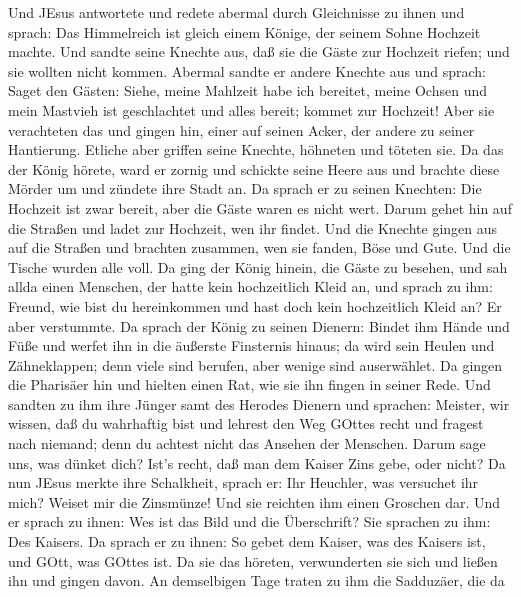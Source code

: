  Und JEsus antwortete und redete abermal durch Gleichnisse
zu ihnen und sprach:  Das Himmelreich ist gleich einem
Könige, der seinem Sohne Hochzeit machte.  Und sandte seine
Knechte aus, daß sie die Gäste zur Hochzeit riefen; und sie wollten
nicht kommen.  Abermal sandte er andere Knechte aus und
sprach: Saget den Gästen: Siehe, meine Mahlzeit habe ich bereitet, meine
Ochsen und mein Mastvieh ist geschlachtet und alles bereit; kommet zur
Hochzeit!  Aber sie verachteten das und gingen hin, einer
auf seinen Acker, der andere zu seiner Hantierung.  Etliche
aber griffen seine Knechte, höhneten und töteten sie.  Da
das der König hörete, ward er zornig und schickte seine Heere aus und
brachte diese Mörder um und zündete ihre Stadt an.  Da
sprach er zu seinen Knechten: Die Hochzeit ist zwar bereit, aber die
Gäste waren es nicht wert.  Darum gehet hin auf die Straßen
und ladet zur Hochzeit, wen ihr findet.  Und die Knechte
gingen aus auf die Straßen und brachten zusammen, wen sie fanden, Böse
und Gute. Und die Tische wurden alle voll.  Da ging der
König hinein, die Gäste zu besehen, und sah allda einen Menschen, der
hatte kein hochzeitlich Kleid an,  und sprach zu ihm:
Freund, wie bist du hereinkommen und hast doch kein hochzeitlich Kleid
an? Er aber verstummte.  Da sprach der König zu seinen
Dienern: Bindet ihm Hände und Füße und werfet ihn in die äußerste
Finsternis hinaus; da wird sein Heulen und Zähneklappen; 
denn viele sind berufen, aber wenige sind auserwählet.  Da
gingen die Pharisäer hin und hielten einen Rat, wie sie ihn fingen in
seiner Rede.  Und sandten zu ihm ihre Jünger samt des
Herodes Dienern und sprachen: Meister, wir wissen, daß du wahrhaftig
bist und lehrest den Weg GOttes recht und fragest nach niemand; denn du
achtest nicht das Ansehen der Menschen.  Darum sage uns,
was dünket dich? Ist's recht, daß man dem Kaiser Zins gebe, oder nicht?
 Da nun JEsus merkte ihre Schalkheit, sprach er: Ihr
Heuchler, was versuchet ihr mich?  Weiset mir die
Zinsmünze! Und sie reichten ihm einen Groschen dar.  Und er
sprach zu ihnen: Wes ist das Bild und die Überschrift?  Sie
sprachen zu ihm: Des Kaisers. Da sprach er zu ihnen: So gebet dem
Kaiser, was des Kaisers ist, und GOtt, was GOttes ist.  Da
sie das höreten, verwunderten sie sich und ließen ihn und gingen davon.
 An demselbigen Tage traten zu ihm die Sadduzäer, die da
